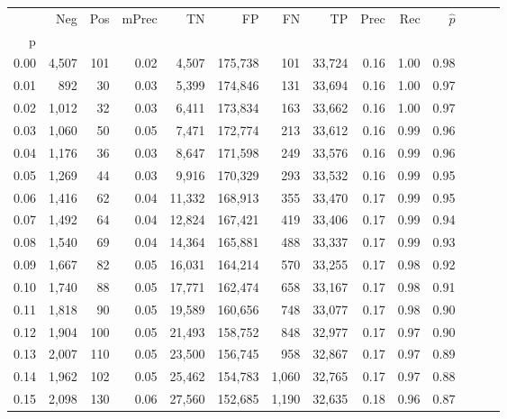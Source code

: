 \begin{tabular}{rrrrrrrrrrrrrr}
\toprule
{} &    Neg &    Pos & mPrec &       TN &       FP &      FN &      TP &  Prec &   Rec & $\hat{p}$ \\
p    &        &        &       &          &          &         &         &       &       &           \\
\midrule
0.00 &  4,507 &    101 &  0.02 &    4,507 &  175,738 &     101 &  33,724 &  0.16 &  1.00 &      0.98 \\
0.01 &    892 &     30 &  0.03 &    5,399 &  174,846 &     131 &  33,694 &  0.16 &  1.00 &      0.97 \\
0.02 &  1,012 &     32 &  0.03 &    6,411 &  173,834 &     163 &  33,662 &  0.16 &  1.00 &      0.97 \\
0.03 &  1,060 &     50 &  0.05 &    7,471 &  172,774 &     213 &  33,612 &  0.16 &  0.99 &      0.96 \\
0.04 &  1,176 &     36 &  0.03 &    8,647 &  171,598 &     249 &  33,576 &  0.16 &  0.99 &      0.96 \\
0.05 &  1,269 &     44 &  0.03 &    9,916 &  170,329 &     293 &  33,532 &  0.16 &  0.99 &      0.95 \\
0.06 &  1,416 &     62 &  0.04 &   11,332 &  168,913 &     355 &  33,470 &  0.17 &  0.99 &      0.95 \\
0.07 &  1,492 &     64 &  0.04 &   12,824 &  167,421 &     419 &  33,406 &  0.17 &  0.99 &      0.94 \\
0.08 &  1,540 &     69 &  0.04 &   14,364 &  165,881 &     488 &  33,337 &  0.17 &  0.99 &      0.93 \\
0.09 &  1,667 &     82 &  0.05 &   16,031 &  164,214 &     570 &  33,255 &  0.17 &  0.98 &      0.92 \\
0.10 &  1,740 &     88 &  0.05 &   17,771 &  162,474 &     658 &  33,167 &  0.17 &  0.98 &      0.91 \\
0.11 &  1,818 &     90 &  0.05 &   19,589 &  160,656 &     748 &  33,077 &  0.17 &  0.98 &      0.90 \\
0.12 &  1,904 &    100 &  0.05 &   21,493 &  158,752 &     848 &  32,977 &  0.17 &  0.97 &      0.90 \\
0.13 &  2,007 &    110 &  0.05 &   23,500 &  156,745 &     958 &  32,867 &  0.17 &  0.97 &      0.89 \\
0.14 &  1,962 &    102 &  0.05 &   25,462 &  154,783 &   1,060 &  32,765 &  0.17 &  0.97 &      0.88 \\
0.15 &  2,098 &    130 &  0.06 &   27,560 &  152,685 &   1,190 &  32,635 &  0.18 &  0.96 &      0.87 \\

\end{tabular}

